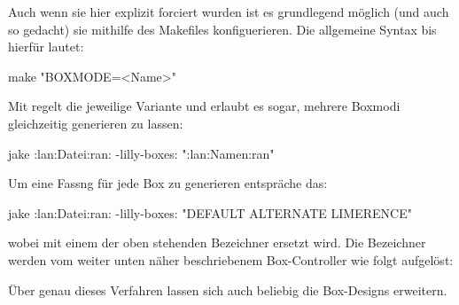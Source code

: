 Auch wenn sie hier explizit forciert wurden ist es grundlegend möglich (und auch so gedacht) sie mithilfe des Makefiles konfiguerieren. Die allgemeine Syntax bis  hierfür lautet:
\begin{bash}
make "BOXMODE=<Name>"
\end{bash}
Mit  regelt \Jake die jeweilige Variante und erlaubt es sogar, mehrere Boxmodi gleichzeitig generieren zu lassen: 
\begin{bash}
jake :lan:Datei:ran: -lilly-boxes: ":lan:Namen:ran"
\end{bash}
Um eine Fassng für jede Box zu generieren entspräche das:
\begin{bash}
jake :lan:Datei:ran: -lilly-boxes: "DEFAULT ALTERNATE LIMERENCE"
\end{bash}
wobei  mit einem der oben stehenden Bezeichner ersetzt wird. Die Bezeichner werden vom weiter unten näher beschriebenem Box-Controller wie folgt aufgelöst:
\begin{latex}

\end{latex}
Über genau dieses Verfahren lassen sich auch beliebig die Box-Designs erweitern.

